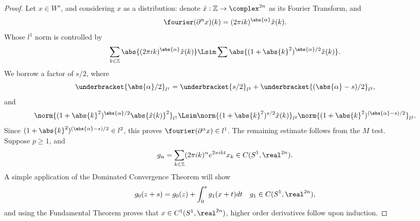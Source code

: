 \documentclass[../main-v2-manifolds.tex]{subfiles}
\begin{document}
\begin{proof}
    Let $x\in W^s$, and considering $x$ as a distribution: denote $\hat{x}:\mathbb{Z}\to\complex^{2n}$ as its Fourier Transform, and
    \[
        \fourier(\partial^\alpha x)(k) = (2\pi i k)^{\abs{\alpha}}\hat{x}(k).
    \]
    Whose $l^1$ norm is controlled by
    \[
        \sum_{k\in\mathbb{Z}}\abs{(2\pi i k)^{\abs{\alpha}}\hat{x}(k)}\Lsim \sum \abs{(1+\abs{k}^2)^{\abs{\alpha}/2}\hat{x}(k)}.
    \]
    We borrow a factor of $s/2$, where
    \[
        \underbracket{\abs{\alpha}/2}_{l^1} = \underbracket{s/2}_{l^2} + \underbracket{(\abs{\alpha} - s)/2}_{l^2},
    \]
    and 
    \[
        \norm{(1+\abs{k}^2)^{\abs{\alpha}/2}\abs{\hat{x}(k)}^2}_{l^1}\Lsim \norm{(1+\abs{k}^2)^{s/2}\hat{x}(k)}_{l^2} \norm{(1+\abs{k}^2)^{(\abs{\alpha} - s)/2}}_{l^2}.
    \]
    Since $(1+\abs{k}^2)^{(\abs{\alpha}-s)/2}\in l^2$, this proves $\fourier(\partial^\alpha x)\in l^1$. The remaining estimate follows from the $M$ test.\\

    Suppose $p\geq 1$, and 
    \[
        g_{\alpha} = \sum_{k\in\mathbb{Z}}(2\pi i k)^{\alpha}e^{2\pi i k t}x_k\in C(S^1,\realtn).
    \]
    A simple application of the Dominated Convergence Theorem will show
    \[
        g_0(z + s) = g_0(z) + \int_0^s g_{1}(x + t)dt\quad g_1\in C(S^1,\realtn),
    \]
    and using the Fundamental Theorem proves that $x\in C^1(S^1,\realtn)$, higher order derivatives follow upon induction.
\end{proof}
\end{document}
